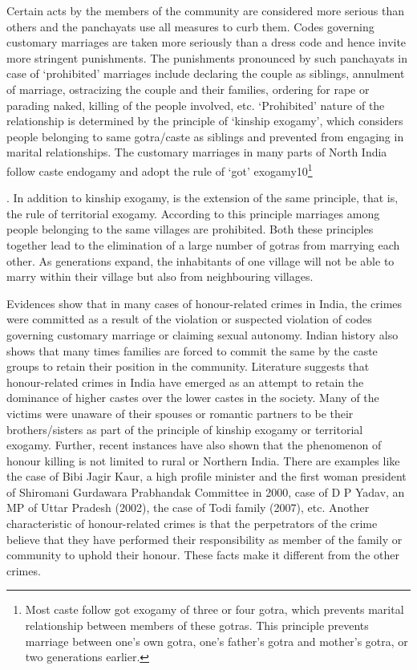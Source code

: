 \begin{multicols}{2}
\noi
Certain acts by the members of the community are considered more serious than others
and the panchayats use all measures to curb them. Codes governing customary
marriages are taken more seriously than a dress code and hence invite more stringent
punishments. The punishments pronounced by such panchayats in case of ‘prohibited’
marriages include declaring the couple as siblings, annulment of marriage, ostracizing
the couple and their families, ordering for rape or parading naked, killing of the people
involved, etc. ‘Prohibited’ nature of the relationship is determined by the principle of
‘kinship exogamy’, which considers people belonging to same gotra/caste as siblings
and prevented from engaging in marital relationships. The customary marriages in
many parts of North India follow caste endogamy and adopt the rule of ‘got’ exogamy10\footnote{Most caste follow got exogamy of three or four gotra, which prevents marital relationship between
members of these gotras. This principle prevents marriage between one’s own gotra, one’s father’s gotra
and mother’s gotra, or two generations earlier.}

\noi.
In addition to kinship exogamy, is the extension of the same principle, that is, the rule
of territorial exogamy. According to this principle marriages among people belonging
to the same villages are prohibited. Both these principles together lead to the
elimination of a large number of gotras from marrying each other. As generations
expand, the inhabitants of one village will not be able to marry within their village but
also from neighbouring villages.

\noi
Evidences show that in many cases of honour-related crimes in India, the crimes were
committed as a result of the violation or suspected violation of codes governing
customary marriage or claiming sexual autonomy. Indian history also shows that many
times families are forced to commit the same by the caste groups to retain their position
in the community. Literature suggests that honour-related crimes in India have emerged
as an attempt to retain the dominance of higher castes over the lower castes in the society. Many of the victims were unaware of their spouses or romantic partners to be
their brothers/sisters as part of the principle of kinship exogamy or territorial exogamy.
Further, recent instances have also shown that the phenomenon of honour killing is not
limited to rural or Northern India. There are examples like the case of Bibi Jagir Kaur,
a high profile minister and the first woman president of Shiromani Gurdawara
Prabhandak Committee in 2000, case of D P Yadav, an MP of Uttar Pradesh (2002),
the case of Todi family (2007), etc. Another characteristic of honour-related crimes is
that the perpetrators of the crime believe that they have performed their responsibility
as member of the family or community to uphold their honour. These facts make it
different from the other crimes. 


\end{multicols}
